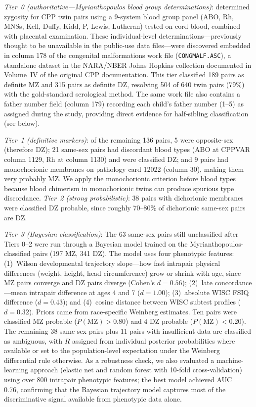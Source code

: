 \documentclass[12pt]{article}
\begin{document}
\textit{Tier~0 (authoritative---Myrianthopoulos blood group determinations)}: \citet{myrianthopoulos1975} determined zygosity for CPP twin pairs using a 9-system blood group panel (ABO, Rh, MNSs, Kell, Duffy, Kidd, P, Lewis, Lutheran) tested on cord blood, combined with placental examination. These individual-level determinations---previously thought to be unavailable in the public-use data files---were discovered embedded in column 178 of the congenital malformations work file (\texttt{CONGMALF.ASC}), a standalone dataset in the NARA/NBER Johns Hopkins collection documented in Volume~IV of the original CPP documentation. This tier classified 189 pairs as definite MZ and 315 pairs as definite DZ, resolving 504 of 640 twin pairs (79\%) with the gold-standard serological method. The same work file also contains a father number field (column 179) recording each child's father number (1--5) as assigned during the study, providing direct evidence for half-sibling classification (see below).

\textit{Tier~1 (definitive markers)}: of the remaining 136 pairs, 5 were opposite-sex (therefore DZ); 21 same-sex pairs had discordant blood types (ABO at CPPVAR column 1129, Rh at column 1130) and were classified DZ; and 9 pairs had monochorionic membranes on pathology card 12022 (column 30), making them very probably MZ. We apply the monochorionic criterion before blood types because blood chimerism in monochorionic twins can produce spurious type discordance. \textit{Tier~2 (strong probabilistic)}: 38 pairs with dichorionic membranes were classified DZ probable, since roughly 70--80\% of dichorionic same-sex pairs are DZ.

\textit{Tier~3 (Bayesian classification)}: The 63 same-sex pairs still unclassified after Tiers 0--2 were run through a Bayesian model trained on the Myrianthopoulos-classified pairs (197 MZ, 341 DZ). The model uses four phenotypic features: (1)~Wilson developmental trajectory slope---how fast intrapair physical differences (weight, height, head circumference) grow or shrink with age, since MZ pairs converge and DZ pairs diverge (Cohen's $d = 0.56$); (2)~late concordance---mean intrapair difference at ages 4 and 7 ($d = 1.00$); (3)~absolute WISC FSIQ difference ($d = 0.43$); and (4)~cosine distance between WISC subtest profiles ($d = 0.32$). Priors came from race-specific Weinberg estimates. Ten pairs were classified MZ probable ($P(\text{MZ}) > 0.80$) and 4 DZ probable ($P(\text{MZ}) < 0.20$). The remaining 38 same-sex pairs plus 11 pairs with insufficient data are classified as ambiguous, with $R$ assigned from individual posterior probabilities where available or set to the population-level expectation under the Weinberg differential rule otherwise. As a robustness check, we also evaluated a machine-learning approach (elastic net and random forest with 10-fold cross-validation) using over 800 intrapair phenotypic features; the best model achieved AUC = 0.76, confirming that the Bayesian trajectory model captures most of the discriminative signal available from phenotypic data alone.
\end{document}
